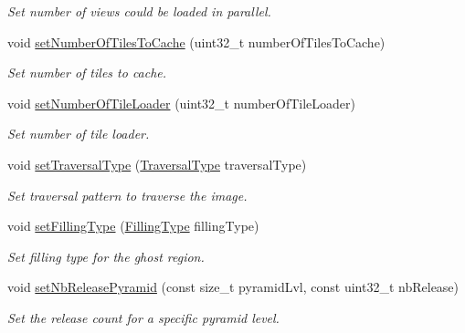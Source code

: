 \begin{DoxyCompactItemize}
\begin{DoxyCompactList}\small\item\em Set number of views could be loaded in parallel. \end{DoxyCompactList}\item 
void \hyperlink{classfi_1_1FastImage_1_1Options_ad208b65af20fb02a91a49b8e6f345cef}{set\+Number\+Of\+Tiles\+To\+Cache} (uint32\+\_\+t number\+Of\+Tiles\+To\+Cache)
\begin{DoxyCompactList}\small\item\em Set number of tiles to cache. \end{DoxyCompactList}\item 
void \hyperlink{classfi_1_1FastImage_1_1Options_a9b060d7dbba17c77f4c5716bb9306827}{set\+Number\+Of\+Tile\+Loader} (uint32\+\_\+t number\+Of\+Tile\+Loader)
\begin{DoxyCompactList}\small\item\em Set number of tile loader. \end{DoxyCompactList}\item 
void \hyperlink{classfi_1_1FastImage_1_1Options_a36359a742735265d1aea6c0463e98d53}{set\+Traversal\+Type} (\hyperlink{namespacefi_a7ba5ce68668e7f273b22e5f56ca6dfcb}{Traversal\+Type} traversal\+Type)
\begin{DoxyCompactList}\small\item\em Set traversal pattern to traverse the image. \end{DoxyCompactList}\item 
void \hyperlink{classfi_1_1FastImage_1_1Options_a6d30e9a1a701156d837cd1693a5c3b1d}{set\+Filling\+Type} (\hyperlink{namespacefi_a6808b618c85d179a330ca388162215bd}{Filling\+Type} filling\+Type)
\begin{DoxyCompactList}\small\item\em Set filling type for the ghost region. \end{DoxyCompactList}\item 
void \hyperlink{classfi_1_1FastImage_1_1Options_a30f2268883c5391b015d5dd737793da5}{set\+Nb\+Release\+Pyramid} (const size\+\_\+t pyramid\+Lvl, const uint32\+\_\+t nb\+Release)
\begin{DoxyCompactList}\small\item\em Set the release count for a specific pyramid level. \end{DoxyCompactList}\end{DoxyCompactItemize}
